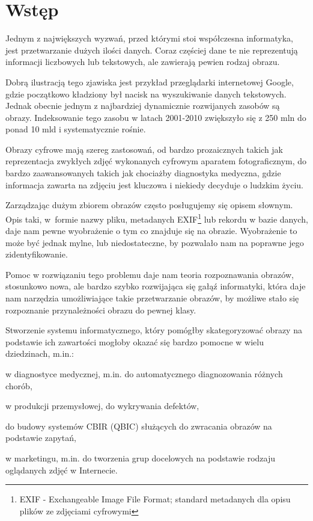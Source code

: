 \chapter*{Wstęp}

Jednym z największych wyzwań, przed którymi stoi współczesna informatyka, jest przetwarzanie dużych ilości danych. Coraz częściej dane te nie reprezentują informacji liczbowych lub tekstowych, ale zawierają pewien rodzaj obrazu. 

Dobrą ilustracją tego zjawiska jest przykład przeglądarki internetowej Google, gdzie początkowo kładziony był nacisk na wyszukiwanie danych tekstowych. Jednak obecnie jednym z najbardziej dynamicznie rozwijanych zasobów są obrazy. Indeksowanie tego zasobu w latach 2001-2010 zwiększyło się z 250 mln do ponad 10 mld i systematycznie rośnie.\cite{Google2010}

Obrazy cyfrowe mają szereg zastosowań, od bardzo prozaicznych takich jak reprezentacja zwykłych zdjęć wykonanych cyfrowym aparatem fotograficznym, do bardzo zaawansowanych takich jak chociażby diagnostyka medyczna, gdzie informacja zawarta na zdjęciu jest kluczowa i niekiedy decyduje o ludzkim życiu.

Zarządzając dużym zbiorem obrazów często posługujemy się opisem słownym. Opis taki, w~formie nazwy pliku, metadanych EXIF\footnote{EXIF - Exchangeable Image File Format; standard metadanych dla opisu plików ze zdjęciami cyfrowymi} lub rekordu w bazie danych, daje nam pewne wyobrażenie o tym co znajduje się na obrazie. Wyobrażenie to może być jednak mylne, lub niedostateczne, by pozwalało nam na poprawne jego zidentyfikowanie.

Pomoc w rozwiązaniu tego problemu daje nam teoria rozpoznawania obrazów, stosunkowo nowa, ale bardzo szybko rozwijająca się gałąź informatyki, która daje nam narzędzia umożliwiające takie przetwarzanie obrazów, by możliwe stało się rozpoznanie przynależności obrazu do pewnej klasy.\cite{Tad91}

Stworzenie systemu informatycznego, który pomógłby skategoryzować obrazy na podstawie ich zawartości mogłoby okazać się bardzo pomocne w wielu dziedzinach, m.in.:
\begin{compactitem}
	\item w diagnostyce medycznej, m.in. do automatycznego diagnozowania różnych chorób\cite{GMM10}\cite{MONTEJO13}\cite{WARWICK10},
	\item w produkcji przemysłowej, do wykrywania defektów\cite{GLAZER08}\cite{SUVDAA2012},
	\item do budowy systemów CBIR (QBIC) służących do zwracania obrazów na podstawie zapytań\cite{LZLM06},
	\item w marketingu, m.in. do tworzenia grup docelowych na podstawie rodzaju oglądanych zdjęć w Internecie\cite{MARKETING12}.
\end{compactitem}

